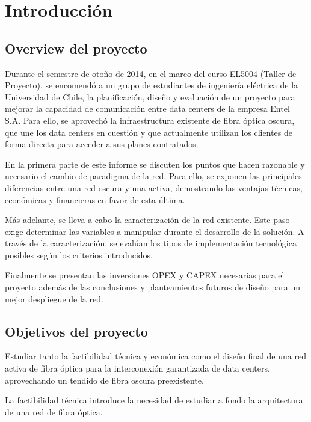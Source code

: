 
\section{Introducci\'on}
\label{sec:intro}

\subsection{Overview del proyecto}
\label{sec:overview}

Durante el semestre de otoño de 2014, en el marco del curso EL5004
(Taller de Proyecto), se encomendó a un grupo de estudiantes de
ingeniería eléctrica de la Universidad de Chile, la planificación,
diseño y evaluación de un proyecto para mejorar la capacidad de
comunicación entre data centers de la empresa Entel S.A. Para ello,
se aprovechó la infraestructura existente de fibra óptica oscura,
que une los data centers en cuestión y que actualmente utilizan los
clientes de forma directa para acceder a sus planes contratados.

En la primera parte de este informe se discuten los puntos que
hacen razonable y necesario el cambio de paradigma de la red. Para
ello, se exponen las principales diferencias entre una red oscura
y una activa, demostrando las ventajas técnicas, económicas y
financieras en favor de esta última.

Más adelante, se lleva a cabo la caracterización de la red existente.
Este paso exige determinar las variables a manipular durante el 
desarrollo de la solución. A través de la caracterización, se 
evalúan los tipos de implementación tecnológica posibles según los 
criterios introducidos.

Finalmente se presentan las inversiones OPEX y CAPEX necesarias
para el proyecto además de las conclusiones y planteamientos futuros
de diseño para un mejor despliegue de la red.

\subsection{Objetivos del proyecto}
\label{sec:objetivos}

Estudiar tanto la factibilidad técnica y económica como el diseño
final de una red activa de fibra óptica para la interconexión
garantizada de data centers, aprovechando un tendido de fibra oscura
preexistente.

La factibilidad técnica introduce la necesidad de estudiar a fondo la
arquitectura de una red de fibra óptica.

